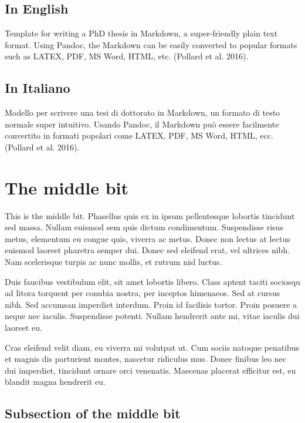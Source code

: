 \documentclass[12pt,a4paper,]{report}
\begin{document}
\hypertarget{in-english}{%
\subsection{In English}\label{in-english}}

Template for writing a PhD thesis in Markdown, a super-friendly plain
text format. Using Pandoc, the Markdown can be easily converted to
popular formats such as LATEX, PDF, MS Word, HTML, etc. (Pollard et al.
2016).

\hypertarget{in-italiano}{%
\subsection{In Italiano}\label{in-italiano}}

Modello per scrivere una tesi di dottorato in Markdown, un formato di
testo normale super intuitivo. Usando Pandoc, il Markdown può essere
facilmente convertito in formati popolari come LATEX, PDF, MS Word,
HTML, ecc. (Pollard et al. 2016).

\hypertarget{the-middle-bit}{%
\section{The middle bit}\label{the-middle-bit}}

This is the middle bit. Phasellus quis ex in ipsum pellentesque lobortis
tincidunt sed massa. Nullam euismod sem quis dictum condimentum.
Suspendisse risus metus, elementum eu congue quis, viverra ac metus.
Donec non lectus at lectus euismod laoreet pharetra semper dui. Donec
sed eleifend erat, vel ultrices nibh. Nam scelerisque turpis ac nunc
mollis, et rutrum nisl luctus.

Duis faucibus vestibulum elit, sit amet lobortis libero. Class aptent
taciti sociosqu ad litora torquent per conubia nostra, per inceptos
himenaeos. Sed at cursus nibh. Sed accumsan imperdiet interdum. Proin id
facilisis tortor. Proin posuere a neque nec iaculis. Suspendisse
potenti. Nullam hendrerit ante mi, vitae iaculis dui laoreet eu.

Cras eleifend velit diam, eu viverra mi volutpat ut. Cum sociis natoque
penatibus et magnis dis parturient montes, nascetur ridiculus mus. Donec
finibus leo nec dui imperdiet, tincidunt ornare orci venenatis. Maecenas
placerat efficitur est, eu blandit magna hendrerit eu.

\hypertarget{subsection-of-the-middle-bit}{%
\subsection{Subsection of the middle
bit}\label{subsection-of-the-middle-bit}}
\end{document}
